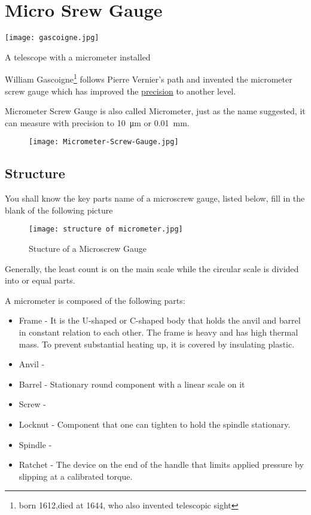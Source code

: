 \documentclass[a4paper]{tufte-handout}
\begin{document}
\section{Micro Srew Gauge}
\begin{marginfigure}
\texttt{[image: gascoigne.jpg]}
\caption{A telescope with a micrometer installed}
\end{marginfigure}
William Gascoigne\footnote{born 1612,died at 1644, who also invented telescopic sight} follows Pierre Vernier's path and invented the micrometer screw gauge which has improved the \href{https://www.lindahall.org/about/news/scientist-of-the-day/william-gascoigne}{precision} to another level.

Micrometer Screw Gauge is also called Micrometer, just as the name suggested, it can measure with precision to \SI{10}{\um} or \SI{0.01}{\mm}.
\begin{figure}
\texttt{[image: Micrometer-Screw-Gauge.jpg]}
\end{figure}

\subsection{Structure}
You shall know the key parts name of a microscrew gauge, listed below, fill in the blank of the following picture
\begin{figure}[h]
\centering
\texttt{[image: structure of micrometer.jpg]}
\caption{Stucture of a Microscrew Gauge}
\end{figure}
Generally, the least count is \uline{\hspace{0.7 in}} on the main scale while the circular scale is divided into \uline{\hspace{0.7 in}} or \uline{\hspace{0.7 in}} equal parts.

A micrometer is composed of the following parts:
\begin{itemize}
  \item Frame -  It is the U-shaped or C-shaped body that holds the anvil and barrel in constant relation to each other. The frame is heavy and has high thermal mass. To prevent substantial heating up, it is covered by insulating plastic.
  \item Anvil - \vspace{0.3 in}
  \item Barrel - Stationary round component with a linear scale on it
  \item Screw - \vspace{0.3 in}
  \item Locknut -  Component that one can tighten to hold the spindle stationary.
  \item Spindle - \vspace{0.3 in}
  \item Ratchet - The device on the end of the handle that limits applied pressure by slipping at a calibrated torque.
\end{itemize}
\end{document}
